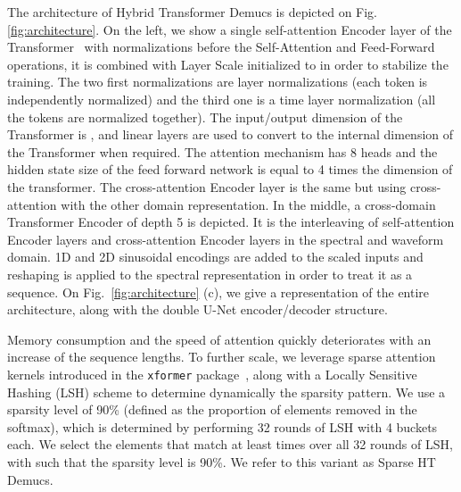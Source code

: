 \documentclass{article}
\begin{document}
The architecture of Hybrid Transformer Demucs is depicted on Fig.\ref{fig:architecture}. On the left, we show a single self-attention Encoder layer of the Transformer~\cite{transformer} with normalizations before the Self-Attention and Feed-Forward operations, it is combined with Layer Scale \cite{layerscale} initialized to  in order to stabilize the training. The two first normalizations are layer normalizations (each token is independently normalized) and the third one is a time layer normalization (all the tokens are normalized together). 
The input/output dimension of the Transformer is , and linear layers are used to convert to the internal
dimension of the Transformer when required.
The attention mechanism has 8 heads and the hidden state size of the feed forward network is equal to 4 times the dimension of the transformer. The cross-attention Encoder layer is the same but using cross-attention with the other domain representation. In the middle, a cross-domain Transformer Encoder of depth 5 is depicted. It is the interleaving of self-attention Encoder layers and cross-attention Encoder layers in the spectral and waveform domain. 1D \cite{transformer} and 2D \cite{2Dpe} sinusoidal encodings are added to the scaled inputs and reshaping is applied to the spectral representation in order to treat it as a sequence. On Fig.~\ref{fig:architecture} (c), we give
a representation of the entire architecture, along with the double U-Net encoder/decoder structure.

Memory consumption and the speed of attention quickly deteriorates with an increase of the sequence lengths.
To further scale, we leverage sparse attention kernels introduced in the \texttt{xformer} package~\cite{xFormers2021},
along with a Locally Sensitive Hashing (LSH) scheme to determine dynamically the sparsity pattern. We use a sparsity level
of 90\% (defined as the proportion of elements removed in the softmax), which is determined by performing 32 rounds of LSH with 4 buckets each. We select the elements that match at least  times over all 32 rounds of LSH, with  such that the sparsity level is 90\%.
We refer to this variant as Sparse HT Demucs.
\end{document}

